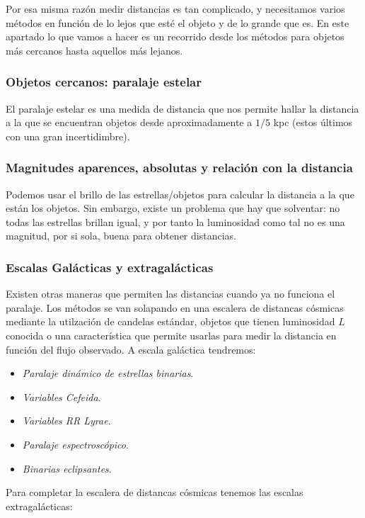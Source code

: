 Por esa misma razón medir distancias es tan complicado, y necesitamos varios métodos en función de lo lejos que esté el objeto y de lo grande que es. En este apartado lo que vamos a hacer es un recorrido desde los métodos para objetos más cercanos hasta aquellos más lejanos. 

\subsubsection{Objetos cercanos: paralaje estelar}

El paralaje estelar es una medida de distancia que nos permite hallar la distancia a la que se encuentran objetos desde aproximadamente a $1/5$ kpc (estos últimos con una gran incertidimbre). 

\subsubsection{Magnitudes aparences, absolutas y relación con la distancia}

Podemos usar el brillo de las estrellas/objetos para calcular la distancia a la que están los objetos. Sin embargo, existe un problema que hay que solventar: no todas las estrellas brillan igual, y por tanto la luminosidad como tal no es una magnitud, por si sola, buena para obtener distancias. 


\subsubsection{Escalas Galácticas y extragalácticas}

Existen otras maneras que permiten las distancias cuando ya no funciona el paralaje. Los métodos se van solapando en una escalera de distancas cósmicas mediante la utilzación de candelas estándar, objetos que tienen luminosidad $L$ conocida o una característica que permite usarlas para medir la distancia en función del flujo observado. A escala galáctica tendremos:

\begin{itemize}
    \item \textit{Paralaje dinámico de estrellas binarias}.
    \item \textit{Variables Cefeida}. 
    \item \textit{Variables RR Lyrae}.
    \item \textit{Paralaje espectroscópico}.
    \item \textit{Binarias eclipsantes}.
\end{itemize}
Para completar la escalera de distancas cósmicas tenemos las escalas extragalácticas:

